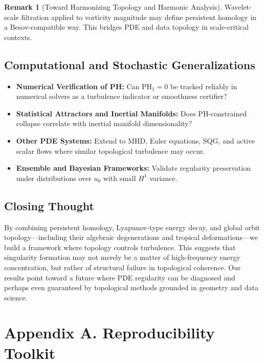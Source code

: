 \documentclass[11pt]{article}
\theoremstyle{definition}
\newtheorem{remark}[theorem]{Remark}
\begin{document}
\begin{remark}[Toward Harmonizing Topology and Harmonic Analysis]
Wavelet-scale filtration applied to vorticity magnitude may define persistent homology in a Besov-compatible way. This bridges PDE and data topology in scale-critical contexts.
\end{remark}

\subsection*{Computational and Stochastic Generalizations}
\begin{itemize}
  \item \textbf{Numerical Verification of PH:} Can $\mathrm{PH}_1 = 0$ be tracked reliably in numerical solvers as a turbulence indicator or smoothness certifier?
  \item \textbf{Statistical Attractors and Inertial Manifolds:} Does PH-constrained collapse correlate with inertial manifold dimensionality?
  \item \textbf{Other PDE Systems:} Extend to MHD, Euler equations, SQG, and active scalar flows where similar topological turbulence may occur.
  \item \textbf{Ensemble and Bayesian Frameworks:} Validate regularity preservation under distributions over $u_0$ with small $H^1$ variance.
\end{itemize}

\subsection*{Closing Thought}
By combining persistent homology, Lyapunov-type energy decay, and global orbit topology—including their algebraic degenerations and tropical deformations—we build a framework where topology controls turbulence. This suggests that singularity formation may not merely be a matter of high-frequency energy concentration, but rather of structural failure in topological coherence. Our results point toward a future where PDE regularity can be diagnosed and perhaps even guaranteed by topological methods grounded in geometry and data science.



\section{Appendix A. Reproducibility Toolkit}
\label{sec:appendixA}
\end{document}
